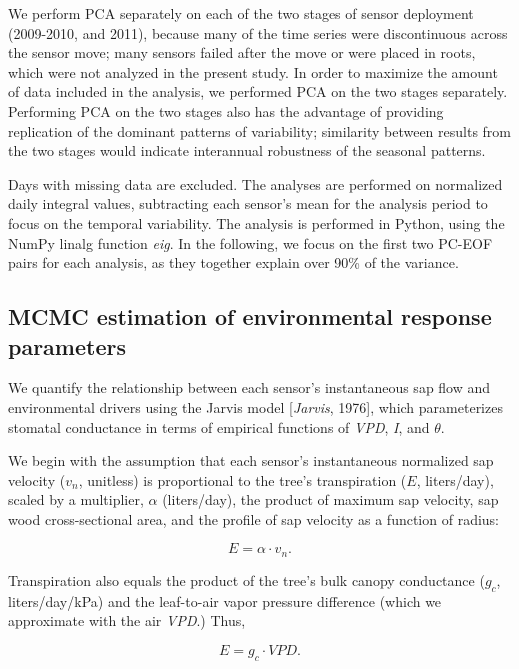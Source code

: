 We perform PCA separately on each of the two stages of sensor deployment (2009-2010, and 2011), because many of the time series were discontinuous across the sensor move; many sensors failed after the move or were placed in roots, which were not analyzed in the present study.  In order to maximize the amount of data included in the analysis, we performed PCA on the two stages separately.  Performing PCA on the two stages also has the advantage of providing replication of the dominant patterns of variability; similarity between results from the two stages would indicate interannual robustness of the seasonal patterns.

Days with missing data are excluded.  The analyses are performed on normalized daily integral values, subtracting each sensor's mean for the analysis period to focus on the temporal variability. The analysis is performed in Python, using the NumPy linalg function \textit{eig}. In the following, we focus on the first two PC-EOF pairs for each analysis, as they together explain over 90\% of the variance.

\subsection{MCMC estimation of environmental response parameters}
We quantify the relationship between each sensor's instantaneous sap flow and environmental drivers using the Jarvis model [\textit{Jarvis}, 1976], which parameterizes stomatal conductance in terms of empirical functions of \textit{VPD}, \textit{I}, and $\theta$.

We begin with the assumption that each sensor's instantaneous normalized sap velocity ($v_n$, unitless) is proportional to the tree's transpiration ($E$, liters/day), scaled by a multiplier, $\alpha$ (liters/day), the product of maximum sap velocity, sap wood cross-sectional area, and the profile of sap velocity as a function of radius:

\begin{equation} %
E = \alpha \cdot v_n.
\end{equation}

Transpiration also equals the product of the tree's bulk canopy conductance ($g_c$, liters/day/kPa) and the leaf-to-air vapor pressure difference (which we approximate with the air \textit{VPD}.)  Thus,

\begin{equation} %
E = g_c \cdot VPD.
\end{equation}

